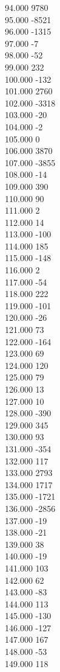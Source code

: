 { 94.000	9780 \\
 95.000	-8521 \\
 96.000	-1315 \\
 97.000	-7 \\
 98.000	-52 \\
 99.000	232 \\
 100.000	-132 \\
 101.000	2760 \\
 102.000	-3318 \\
 103.000	-20 \\
 104.000	-2 \\
 105.000	0 \\
 106.000	3870 \\
 107.000	-3855 \\
 108.000	-14 \\
 109.000	390 \\
 110.000	90 \\
 111.000	2 \\
 112.000	14 \\
 113.000	-100 \\
 114.000	185 \\
 115.000	-148 \\
 116.000	2 \\
 117.000	-54 \\
 118.000	222 \\
 119.000	-101 \\
 120.000	-26 \\
 121.000	73 \\
 122.000	-164 \\
 123.000	69 \\
 124.000	120 \\
 125.000	79 \\
 126.000	13 \\
 127.000	10 \\
 128.000	-390 \\
 129.000	345 \\
 130.000	93 \\
 131.000	-354 \\
 132.000	117 \\
 133.000	2793 \\
 134.000	1717 \\
 135.000	-1721 \\
 136.000	-2856 \\
 137.000	-19 \\
 138.000	-21 \\
 139.000	38 \\
 140.000	-19 \\
 141.000	103 \\
 142.000	62 \\
 143.000	-83 \\
 144.000	113 \\
 145.000	-130 \\
 146.000	-127 \\
 147.000	167 \\
 148.000	-53 \\
 149.000	118 \\
}
